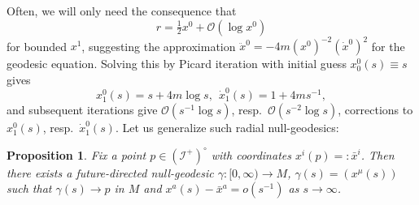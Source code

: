 \documentclass[reqno,11pt,letterpaper]{amsart}
\numberwithin{equation}{section}
\numberwithin{figure}{section}
\newtheorem{prop}[thm]{Proposition}
\theoremstyle{definition}
\theoremstyle{remark}
\newcommand{\mc}{\mathcal}
\newcommand{\cO}{\mc O}
\newcommand{\ms}{\mathscr}
\newcommand{\scri}{\ms I}
\newcommand{\half}{\tfrac{1}{2}}
\begin{document}
Often, we will only need the consequence that
\begin{equation}
\label{EqLRrstar}
  r=\half x^0+\cO(\log x^0)
\end{equation}
for bounded $x^1$, suggesting the approximation $\ddot x^0=-4 m(x^0)^{-2}(\dot x^0)^2$ for the geodesic equation. Solving this by Picard iteration with initial guess $x^0_0(s)\equiv s$ gives
\[
  x^0_1(s)=s+4 m\log s,\ \ 
  \dot x^0_1(s)=1+4 m s^{-1},
\]
and subsequent iterations give $\cO(s^{-1}\log s)$, resp.\ $\cO(s^{-2}\log s)$, corrections to $x^0_1(s)$, resp.\ $\dot x^0_1(s)$. Let us generalize such radial null-geodesics:
\begin{prop}
\label{PropLR}
  Fix a point $p\in(\scri^+)^\circ$ with coordinates $x^i(p)=:\bar x^i$. Then there exists a future-directed null-geodesic $\gamma\colon[0,\infty)\to M$, $\gamma(s)=(x^\mu(s))$ such that $\gamma(s)\to p$ in $M$ and $x^a(s)-\bar x^a=o(s^{-1})$ as $s\to\infty$.
\end{prop}
\end{document}
